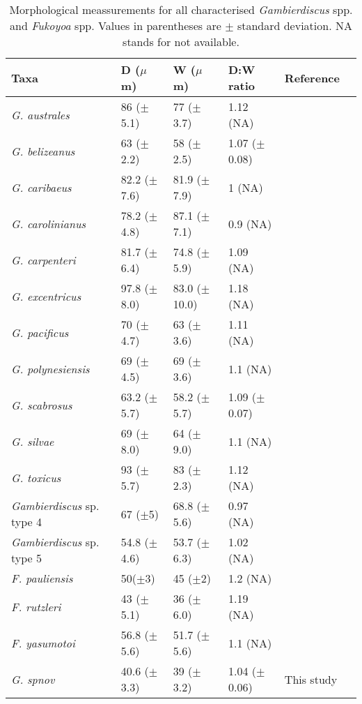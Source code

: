 \documentclass[12pt]{article}
\begin{document}
\FloatBarrier
\begin{table}
\caption{Morphological meassurements for all characterised \emph{Gambierdiscus} spp. and \emph{Fukoyoa} spp. Values in parentheses are $\pm$ standard deviation. NA stands for not available.}
\label{tbl:GlobalSizeTable}
\begin{tabular}{ | p{3.5cm} | p{2.5cm} | p{2.5cm} | p{2.5cm} | p{2.5cm} | p{1.8cm} | }
\hline
\textbf{Taxa} &  \textbf{D ($\mu$m)} & \textbf{W ($\mu$m)}  & \textbf{D:W ratio} & \textbf{Reference} \\
 \hline
\textit{G. australes}	& 86 ($\pm$5.1) & 77 ($\pm$3.7) & 1.12 (NA) & \citep{chinain1999morphology} \\
 \hline
 \textit{G. belizeanus}	& 63 ($\pm$2.2) & 58 ($\pm$2.5) & 1.07 ($\pm$0.08) & \citep{chinain1999morphology} \\
 \hline
 \textit{G. caribaeus}	& 82.2 ($\pm$7.6)	& 81.9 ($\pm$7.9)	& 1 (NA) & \citep{litaker2009taxonomy}\\
 \hline
 \textit{G. carolinianus} & 78.2 ($\pm$4.8) & 87.1 ($\pm$7.1) & 0.9 (NA) & \citep{litaker2009taxonomy} \\
 \hline
\textit{G. carpenteri} &	81.7 ($\pm$6.4) &	74.8 ($\pm$5.9) & 1.09 (NA) & \citep{litaker2009taxonomy} \\
 \hline
\textit{G. excentricus	}& 97.8 ($\pm$8.0) &	83.0 ($\pm$10.0) & 1.18 (NA) & \citep{litaker2009taxonomy} \\
 \hline
\textit{G. pacificus}	& 70 ($\pm$4.7) & 63 ($\pm$3.6) & 1.11 (NA) & \citep{chinain1999morphology}\\
 \hline
\textit{G. polynesiensis} & 69 ($\pm$4.5) & 69 ($\pm$3.6) & 1.1 (NA) &	\citep{chinain1999morphology} \\ 
 \hline
\textit{G. scabrosus}	& 63.2 ($\pm$5.7) & 58.2 ($\pm$5.7) & 1.09 ($\pm$0.07) & \citep{nishimura2014morphology}\\
 \hline
 \textit{G. silvae}	& 69 ($\pm$8.0) & 64 ($\pm$9.0) & 1.1 (NA) & \citep{fraga2014genus,litaker2010global}\\
 \hline
\textit{G. toxicus}	& 93 ($\pm$5.7) & 83 ($\pm$2.3) & 1.12 (NA) & \citep{litaker2009taxonomy}\\
 \hline
 \emph{Gambierdiscus} sp. type 4	& 67 ($\pm$5) & 68.8 ($\pm$5.6) & 0.97 (NA) & \citep{xu2014distribution} \\
 \hline
 \emph{Gambierdiscus} sp. type 5 & 54.8 ($\pm$4.6)	& 53.7 ($\pm$6.3)& 1.02 (NA) & \citep{xu2014distribution} \\
 \hline
 \textit{F. pauliensis} & 50($\pm$3) & 45 ($\pm$2) & 1.2 (NA) & \citep{gomez2015fukuyoa} \\
 \hline
\textit{F. rutzleri }& 43 ($\pm$5.1)	& 36 ($\pm$6.0) & 1.19 (NA) & \citep{litaker2009taxonomy}\\
 \hline
\textit{F. yasumotoi }& 56.8 ($\pm$5.6)	& 51.7 ($\pm$5.6) & 1.1 (NA) & \citep{litaker2009taxonomy} \\
 \hline
\textit{G. spnov}  & 40.6 ($\pm$3.3) & 39 ($\pm$3.2) & 1.04 ($\pm$0.06) & This study \\
   \hline
\end{tabular}
\end{table}
\end{document}
